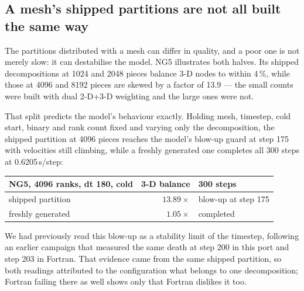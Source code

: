 \documentclass[11pt,a4paper]{article}
\begin{document}
\subsection{A mesh's shipped partitions are not all built the same way}

The partitions distributed with a mesh can differ in quality, and a poor one is not merely
slow: it can destabilise the model. NG5 illustrates both halves. Its shipped decompositions at
1024 and 2048 pieces balance 3-D nodes to within 4\,\%, while those at 4096 and 8192 pieces
are skewed by a factor of 13.9 --- the small counts were built with dual 2-D+3-D weighting and
the large ones were not.

That split predicts the model's behaviour exactly. Holding mesh, timestep, cold start, binary
and rank count fixed and varying only the decomposition, the shipped partition at 4096 pieces
reaches the model's blow-up guard at step 175 with velocities still climbing, while a freshly
generated one completes all 300 steps at 0.6205\,s/step:

\begin{center}\small
\begin{tabular}{lrl}
\toprule
NG5, 4096 ranks, dt 180, cold & 3-D balance & 300 steps \\
\midrule
shipped partition & $13.89\times$ & blow-up at step 175 \\
freshly generated & $1.05\times$ & completed \\
\bottomrule
\end{tabular}
\end{center}

\noindent
We had previously read this blow-up as a stability limit of the timestep, following an earlier
campaign that measured the same death at step 200 in this port and step 203 in Fortran. That
evidence came from the same shipped partition, so both readings attributed to the
configuration what belongs to one decomposition; Fortran failing there as well shows only that
Fortran dislikes it too.
\end{document}
